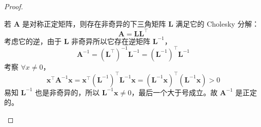 \documentclass{sjtuarticle}
\begin{document}
\begin{itemize}
\begin{proof}
\begin{itemize}
            若 $\bm{A}$ 是对称正定矩阵，则存在非奇异的下三角矩阵 $\bm{L}$ 满足它的 Cholesky 分解：
            \begin{equation*}
                \bm{A}=\bm{L}\bm{L}^\top
            \end{equation*}
            考虑它的逆，由于 $\bm{L}$ 非奇异所以它存在逆矩阵 $\bm{L}^{-1}$，
            \begin{equation*}
                \bm{A}^{-1}=(\bm{L}^\top)^{-1}\bm{L}^{-1}=(\bm{L}^{-1})^\top\bm{L}^{-1}
            \end{equation*}
            考察 $\forall x\neq 0$，
            \begin{equation*}
                \bm{x}^\top \bm{A}^{-1}\bm{x}=\bm{x}^\top (\bm{L}^{-1})^\top\bm{L}^{-1} \bm{x}=(\bm{L}^{-1} \bm{x})^\top (\bm{L}^{-1} \bm{x})>0
            \end{equation*}
            易知 $\bm{L}^{-1}$ 也是非奇异的，所以 $\bm{L}^{-1}\bm{x}\neq 0$，最后一个大于号成立。故 $\bm{A}^{-1}$ 是正定的。

            



\end{itemize}
\end{proof}
\end{itemize}
\end{document}
